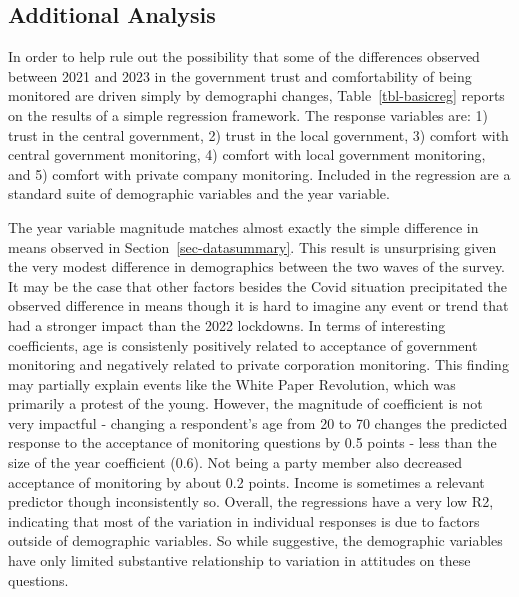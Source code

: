 \documentclass[
  letterpaper,
  DIV=11,
  numbers=noendperiod]{scrartcl}
\begin{document}
\hypertarget{sec-analysis}{%
\subsection{Additional Analysis}\label{sec-analysis}}

In order to help rule out the possibility that some of the differences
observed between 2021 and 2023 in the government trust and
comfortability of being monitored are driven simply by demographi
changes, Table~\ref{tbl-basicreg} reports on the results of a simple
regression framework. The response variables are: 1) trust in the
central government, 2) trust in the local government, 3) comfort with
central government monitoring, 4) comfort with local government
monitoring, and 5) comfort with private company monitoring. Included in
the regression are a standard suite of demographic variables and the
year variable.

The year variable magnitude matches almost exactly the simple difference
in means observed in Section~\ref{sec-datasummary}. This result is
unsurprising given the very modest difference in demographics between
the two waves of the survey. It may be the case that other factors
besides the Covid situation precipitated the observed difference in
means though it is hard to imagine any event or trend that had a
stronger impact than the 2022 lockdowns. In terms of interesting
coefficients, age is consistenly positively related to acceptance of
government monitoring and negatively related to private corporation
monitoring. This finding may partially explain events like the White
Paper Revolution, which was primarily a protest of the young. However,
the magnitude of coefficient is not very impactful - changing a
respondent's age from 20 to 70 changes the predicted response to the
acceptance of monitoring questions by 0.5 points - less than the size of
the year coefficient (0.6). Not being a party member also decreased
acceptance of monitoring by about 0.2 points. Income is sometimes a
relevant predictor though inconsistently so. Overall, the regressions
have a very low R2, indicating that most of the variation in individual
responses is due to factors outside of demographic variables. So while
suggestive, the demographic variables have only limited substantive
relationship to variation in attitudes on these questions.
\end{document}
